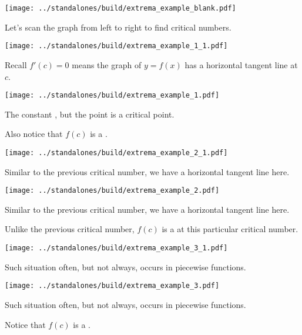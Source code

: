 \documentclass[12pt, handout]{beamer}
\begin{document}
 
\begin{frame}[t]
  \texttt{[image: ../standalones/build/extrema\_example\_blank.pdf]}

  Let's scan the graph from left to right to find critical numbers.
\end{frame}

\begin{frame}[t]
  \texttt{[image: ../standalones/build/extrema\_example\_1\_1.pdf]}

  Recall \(f'(c) = 0\) means the graph of \(y = f(x)\) has a horizontal tangent line at \(c\).
\end{frame}

\begin{frame}[t]
  \texttt{[image: ../standalones/build/extrema\_example\_1.pdf]}
  
  \pause
  The constant , but the point  is a critical point.

  Also notice that \(f(c)\) is a .
\end{frame}

\begin{frame}[t]
  \texttt{[image: ../standalones/build/extrema\_example\_2\_1.pdf]}

  Similar to the previous critical number, we have a horizontal tangent line here.
\end{frame}

\begin{frame}[t]
  \texttt{[image: ../standalones/build/extrema\_example\_2.pdf]}
  
  Similar to the previous critical number, we have a horizontal tangent line here.
  \pause

  Unlike the previous critical number, \(f(c)\) is a  at this particular critical number.
\end{frame}


\begin{frame}[t]
  \texttt{[image: ../standalones/build/extrema\_example\_3\_1.pdf]}

  Such situation often, but not always, occurs in piecewise functions.
\end{frame}

\begin{frame}[t]
  \texttt{[image: ../standalones/build/extrema\_example\_3.pdf]}
  
  Such situation often, but not always, occurs in piecewise functions.

  \pause 
  Notice that \(f(c)\) is a .
\end{frame}
\end{document}

